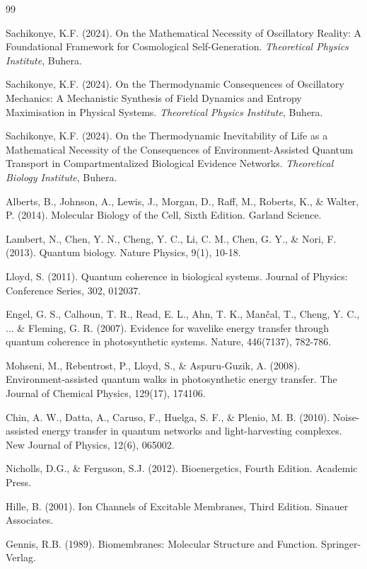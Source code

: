 \documentclass[12pt,a4paper]{article}
\begin{document}
\begin{thebibliography}{99}

Sachikonye, K.F. (2024). On the Mathematical Necessity of Oscillatory Reality: A Foundational Framework for Cosmological Self-Generation. \textit{Theoretical Physics Institute}, Buhera.

Sachikonye, K.F. (2024). On the Thermodynamic Consequences of Oscillatory Mechanics: A Mechanistic Synthesis of Field Dynamics and Entropy Maximisation in Physical Systems. \textit{Theoretical Physics Institute}, Buhera.

Sachikonye, K.F. (2024). On the Thermodynamic Inevitability of Life as a Mathematical Necessity of the Consequences of Environment-Assisted Quantum Transport in Compartmentalized Biological Evidence Networks. \textit{Theoretical Biology Institute}, Buhera.

Alberts, B., Johnson, A., Lewis, J., Morgan, D., Raff, M., Roberts, K., \& Walter, P. (2014). Molecular Biology of the Cell, Sixth Edition. Garland Science.

Lambert, N., Chen, Y. N., Cheng, Y. C., Li, C. M., Chen, G. Y., \& Nori, F. (2013). Quantum biology. Nature Physics, 9(1), 10-18.

Lloyd, S. (2011). Quantum coherence in biological systems. Journal of Physics: Conference Series, 302, 012037.

Engel, G. S., Calhoun, T. R., Read, E. L., Ahn, T. K., Mančal, T., Cheng, Y. C., ... \& Fleming, G. R. (2007). Evidence for wavelike energy transfer through quantum coherence in photosynthetic systems. Nature, 446(7137), 782-786.

Mohseni, M., Rebentrost, P., Lloyd, S., \& Aspuru‐Guzik, A. (2008). Environment‐assisted quantum walks in photosynthetic energy transfer. The Journal of Chemical Physics, 129(17), 174106.

Chin, A. W., Datta, A., Caruso, F., Huelga, S. F., \& Plenio, M. B. (2010). Noise-assisted energy transfer in quantum networks and light-harvesting complexes. New Journal of Physics, 12(6), 065002.

Nicholls, D.G., \& Ferguson, S.J. (2012). Bioenergetics, Fourth Edition. Academic Press.

Hille, B. (2001). Ion Channels of Excitable Membranes, Third Edition. Sinauer Associates.

Gennis, R.B. (1989). Biomembranes: Molecular Structure and Function. Springer-Verlag.

\end{thebibliography}
\end{document}
